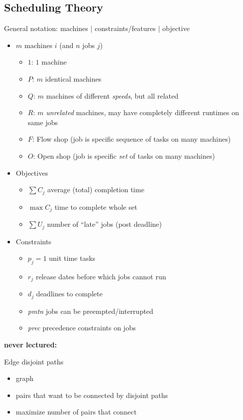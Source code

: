 \documentclass{article}
\begin{document}
\subsection{Scheduling Theory}

General notation: machines $\mid$ constraints/features $\mid$ objective
\begin{itemize}
\item $m$ machines $i$ (and $n$ jobs $j$)
\begin{itemize}
\item $1$: $1$ machine
\item $P$: $m$ identical machines
\item $Q$: $m$ machines of different \emph{speeds}, but all related
\item $R$: $m$ \emph{unrelated} machines, may have completely
  different runtimes on same jobs
\item $F$: Flow shop (job is specific sequence of tasks on many machines)
\item $O$: Open shop (job is specific \emph{set} of tasks on many machines)
\end{itemize}
\item Objectives
\begin{itemize}
\item $\sum C_j$ average (total) completion time
\item $\max C_j$ time to complete whole set
\item $\sum U_j$ number of ``late'' jobs (post deadline)
\end{itemize}
\item Constraints
\begin{itemize}
\item $p_j=1$ unit time tasks
\item $r_j$ release dates before which jobs cannot run
\item $d_j$ deadlines to complete
\item \emph{pmtn} jobs can be preempted/interrupted
\item \emph{prec} precedence constraints on jobs
\end{itemize}
\end{itemize}

\iffalse
\textbf{never lectured:}

Edge disjoint paths
\begin{itemize}
\item graph
\item pairs that want to be connected by disjoint paths
\item maximize number of pairs that connect
\end{itemize}
\end{document}
